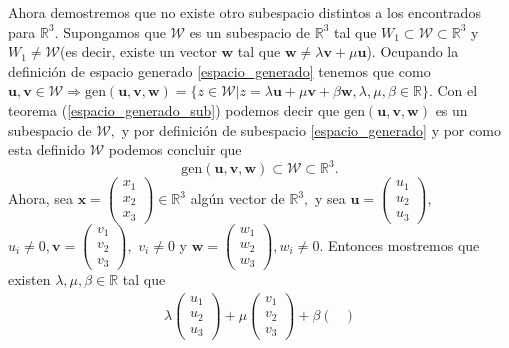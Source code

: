 \documentclass[11pt,letterpaper]{article}
\newcommand{\mR}{\mathbb{R}}
\newcommand{\gen}{\text{gen}}
\begin{document}
\begin{enumerate}
Ahora demostremos que no existe otro subespacio distintos a los encontrados para $\mR^3.$ Supongamos que $\mathcal{W}$ es un subespacio de $\mR^3$ tal que $W_1\subset \mathcal{W} \subset \mR^3$ y $W_1\neq \mathcal{W}$(es decir, existe un vector $\textbf{w}$ tal que $\textbf{w}\neq  \lambda \textbf{v}+\mu \textbf{u}$). Ocupando la definición de espacio generado \ref{espacio_generado} tenemos que como $\textbf{u},\textbf{v}\in \mathcal{W}\Rightarrow \gen(\textbf{u},\textbf{v}, \textbf{w})= \{z\in \mathcal{W}| z=\lambda \textbf{u}+\mu \textbf{v}+\beta \textbf{w}, \lambda, \mu, \beta \in \mR \}$. Con el teorema (\ref{espacio_generado_sub}) podemos decir que $\gen(\textbf{u}, \textbf{v}, \textbf{w})$ es un subespacio de $\mathcal{W},$ y por definición de subespacio \ref{espacio_generado} y por como esta definido $\mathcal{W}$ podemos concluir que 
\begin{equation} \label{gen_uvw}
\gen(\textbf{u}, \textbf{v}, \textbf{w})\subset \mathcal{W}\subset \mR^3.
\end{equation} 
Ahora, sea $\textbf{x}=\begin{pmatrix}
x_1\\
x_2\\
x_3
\end{pmatrix}\in \mR^3$ algún vector de $\mR^3,$ y sea $\textbf{u}=\begin{pmatrix}
u_1\\
u_2\\
u_3
\end{pmatrix}$, $u_i\neq 0 , \textbf{v}=\begin{pmatrix}
v_1\\
v_2\\
v_3
\end{pmatrix},$ $v_i\neq 0$ y $\textbf{w}=\begin{pmatrix}
w_1\\
w_2\\
w_3
\end{pmatrix},w_i\neq 0.$ Entonces mostremos que existen $\lambda, \mu,\beta\in \mR$ tal que 
\begin{align*}
\lambda \begin{pmatrix}
u_1\\
u_2\\
u_3
\end{pmatrix} +\mu \begin{pmatrix}
v_1\\
v_2\\
v_3
\end{pmatrix}+\beta\begin{pmatrix}

\end{pmatrix}
\end{align*}
\end{enumerate}
\end{document}
